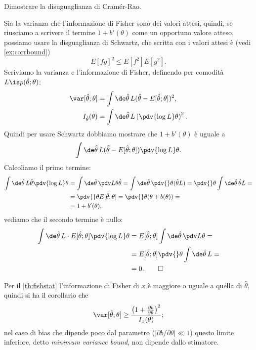 \begin{exercise}
    Dimostrare la disuguaglianza di Cramér-Rao.
\end{exercise}

\begin{solution}
	Sia la varianza che l'informazione di Fisher sono dei valori attesi, quindi,
	se riusciamo a scrivere il termine $1+b'(\theta)$ come un opportuno valore atteso,
	possiamo usare la disguaglianza di Schwartz,
	che scritta con i valori attesi è (vedi \autoref{ex:corrbound})
	\begin{equation*}
		E[fg]^2 \le E[f^2]E[g^2].
	\end{equation*}
	Scriviamo la varianza e l'informazione di Fisher,
	definendo per comodità $L \is p(\hat\theta;\theta)$:
	\begin{align*}
		\var[\hat\theta;\theta]
		&= \int\de\hat\theta\, L (\hat\theta-E[\hat\theta;\theta])^2, \\
		I_{\hat\theta}(\theta)
		&= \int\de\hat\theta\, L \left( \pdv{\log L}\theta \right)^2.
	\end{align*}
	Quindi per usare Schwartz dobbiamo mostrare che $1+b'(\theta)$ è uguale a
	\begin{equation*}
		\int\de\hat\theta\, L (\hat\theta-E[\hat\theta;\theta]) \pdv{\log L}\theta.
	\end{equation*}
	Calcoliamo il primo termine:
	\begin{align*}
		\int \de\hat\theta\,
		L \hat\theta \pdv{\log L}\theta 
		&= \int \de\hat\theta\,
		\pdv L\theta \hat\theta
		= \int \de\hat\theta\,
		\pdv{}\theta (\hat\theta L)
		= \pdv{}\theta \int \de\hat\theta\, \hat\theta L = \\
		&= \pdv{}\theta E[\hat\theta;\theta]
		= \pdv{}\theta (\theta + b(\theta)) = \\
		&= 1 + b'(\theta),
	\end{align*}
	vediamo che il secondo termine è nullo:
	\begin{align*}
		\int \de\hat\theta\,
		L\cdot E[\hat\theta;\theta] \pdv{\log L}\theta
		&= E[\hat\theta;\theta] \int \de\hat\theta\, \pdv L\theta = \\
		&= E[\hat\theta;\theta] \pdv{}\theta \int \de\hat\theta\, L = \\
		&= 0. \qedhere
	\end{align*}
\end{solution}

Per il \autoref{th:fishstat} l'informazione di Fisher di $x$ è maggiore o uguale a quella di $\hat\theta$,
quindi si ha il corollario che
\begin{equation*}
	\var[\hat\theta;\theta] \ge \frac{\left( 1 + \frac{\partial b}{\partial\theta} \right)^2}{I_x(\theta)};
\end{equation*}
nel caso di bias che dipende poco dal parametro ($|\partial b/\partial\theta| \ll 1$)
questo limite inferiore, detto \emph{minimum variance bound}, non dipende dallo stimatore.

